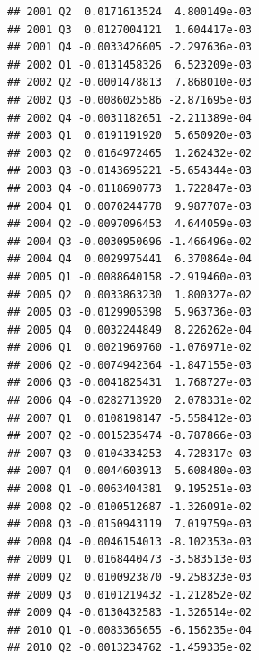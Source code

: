 \documentclass[12pt,a4paper,]{article}
\newcommand{\0}{\mathbf{0}}
\newenvironment{Shaded}{\begin{snugshade}}{\end{snugshade}}
\newcommand{\CommentTok}[1]{\textcolor[rgb]{0.56,0.35,0.01}{\textit{#1}}}
\newcommand{\NormalTok}[1]{#1}
\newcommand{\OperatorTok}[1]{\textcolor[rgb]{0.81,0.36,0.00}{\textbf{#1}}}
\begin{document}
\begin{verbatim}
## 2001 Q2  0.0171613524  4.800149e-03
## 2001 Q3  0.0127004121  1.604417e-03
## 2001 Q4 -0.0033426605 -2.297636e-03
## 2002 Q1 -0.0131458326  6.523209e-03
## 2002 Q2 -0.0001478813  7.868010e-03
## 2002 Q3 -0.0086025586 -2.871695e-03
## 2002 Q4 -0.0031182651 -2.211389e-04
## 2003 Q1  0.0191191920  5.650920e-03
## 2003 Q2  0.0164972465  1.262432e-02
## 2003 Q3 -0.0143695221 -5.654344e-03
## 2003 Q4 -0.0118690773  1.722847e-03
## 2004 Q1  0.0070244778  9.987707e-03
## 2004 Q2 -0.0097096453  4.644059e-03
## 2004 Q3 -0.0030950696 -1.466496e-02
## 2004 Q4  0.0029975441  6.370864e-04
## 2005 Q1 -0.0088640158 -2.919460e-03
## 2005 Q2  0.0033863230  1.800327e-02
## 2005 Q3 -0.0129905398  5.963736e-03
## 2005 Q4  0.0032244849  8.226262e-04
## 2006 Q1  0.0021969760 -1.076971e-02
## 2006 Q2 -0.0074942364 -1.847155e-03
## 2006 Q3 -0.0041825431  1.768727e-03
## 2006 Q4 -0.0282713920  2.078331e-02
## 2007 Q1  0.0108198147 -5.558412e-03
## 2007 Q2 -0.0015235474 -8.787866e-03
## 2007 Q3 -0.0104334253 -4.728317e-03
## 2007 Q4  0.0044603913  5.608480e-03
## 2008 Q1 -0.0063404381  9.195251e-03
## 2008 Q2 -0.0100512687 -1.326091e-02
## 2008 Q3 -0.0150943119  7.019759e-03
## 2008 Q4 -0.0046154013 -8.102353e-03
## 2009 Q1  0.0168440473 -3.583513e-03
## 2009 Q2  0.0100923870 -9.258323e-03
## 2009 Q3  0.0101219432 -1.212852e-02
## 2009 Q4 -0.0130432583 -1.326514e-02
## 2010 Q1 -0.0083365655 -6.156235e-04
## 2010 Q2 -0.0013234762 -1.459335e-02
\end{verbatim}

\begin{Shaded}
\end{Shaded}
\end{document}
